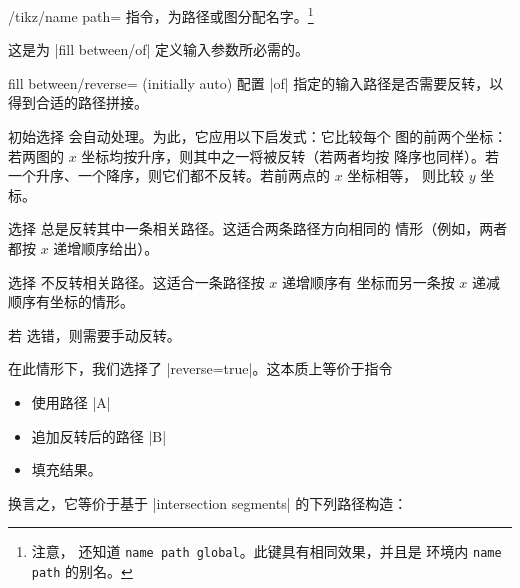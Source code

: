 \begin{key}{/tikz/name path=}
    \Tikz{} 指令，为路径或图分配名字。\footnote{注意，\tikzname{} 还知道
    \texttt{name path global}。此键具有相同效果，并且是 \PGFPlots{} 环境内
    \texttt{name path} 的别名。}

    这是为 |fill between/of| 定义输入参数所必需的。
\end{key}

\begin{tikzkey}{fill between/reverse= (initially auto)}
    配置 |of| 指定的输入路径是否需要反转，以得到合适的路径拼接。

    初始选择  会自动处理。为此，它应用以下启发式：它比较每个
    图的前两个坐标：若两图的 $x$ 坐标均按升序，则其中之一将被反转（若两者均按
    降序也同样）。若一个升序、一个降序，则它们都不反转。若前两点的 $x$ 坐标相等，
    则比较 $y$ 坐标。

    选择  总是反转其中一条相关路径。这适合两条路径方向相同的
    情形（例如，两者都按 $x$ 递增顺序给出）。

    选择  不反转相关路径。这适合一条路径按 $x$ 递增顺序有
    坐标而另一条按 $x$ 递减顺序有坐标的情形。

    若 \PGFPlots{} 选错，则需要手动反转。
\begin{codeexample}[]
\end{codeexample}
    在此情形下，我们选择了 |reverse=true|。这本质上等价于指令
    \begin{itemize}
        \item 使用路径 |A|
        \item 追加反转后的路径 |B|
        \item 填充结果。
    \end{itemize}
    换言之，它等价于基于 |intersection segments| 的下列路径构造：
\begin{codeexample}[]
\end{codeexample}
\end{tikzkey}
